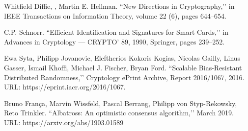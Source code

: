 \documentclass[8pt,fleqn,openany]{book}
\begin{document}
\begin{thebibliography}{99}
 Whitfield Diffie, , Martin E. Hellman. ``New Directions in Cryptography,’’   in IEEE Transactions on Information Theory, volume 22 (6), pages 644–654. 

 C.P. Schnorr. ``Efficient Identification and Signatures for Smart Cards,’’
in Advances in Cryptology — CRYPTO’ 89, 1990, Springer, pages 239–252.

 Ewa Syta, Philipp Jovanovic, Eleftherios Kokoris Kogias, Nicolas Gailly, Linus Gasser, Ismail Khoffi, Michael J. Fischer, Bryan Ford. ``Scalable Bias-Resistant Distributed Randomness,’’ Cryptology ePrint Archive, Report 2016/1067, 2016. URL: https://eprint.iacr.org/2016/1067.

 Bruno Fran{\c c}a, Marvin Wissfeld, Pascal Berrang, Philipp von Styp-Rekowsky, Reto Trinkler. ``Albatross: An optimistic consensus algorithm,’’ March 2019. URL: https://arxiv.org/abs/1903.01589

\end{thebibliography}
\end{document}
